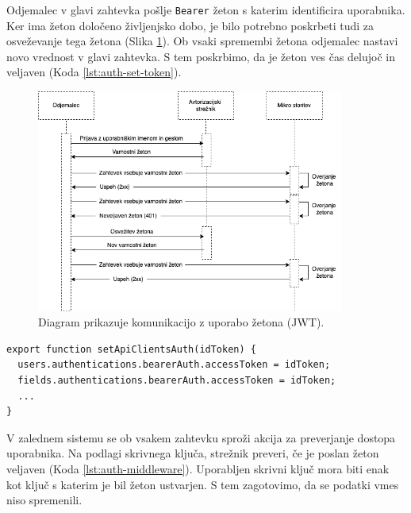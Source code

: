 Odjemalec v glavi zahtevka pošlje \verb=Bearer= žeton s katerim identificira uporabnika. Ker ima žeton določeno življenjsko dobo, je bilo potrebno poskrbeti tudi za osveževanje tega žetona (Slika \ref{token-flow}). Ob vsaki spremembi žetona odjemalec nastavi novo vrednost v glavi zahtevka. S tem poskrbimo, da je žeton ves čas delujoč in veljaven (Koda \ref{lst:auth-set-token}).

\begin{figure}[h]
\begin{center}
\includegraphics[width=0.9\textwidth]{slike/token-flow.png}
\end{center}
\caption{ Diagram prikazuje komunikacijo z uporabo žetona (JWT). }
\label{token-flow}
\end{figure}

\begin{lstlisting}[style=mystyle,caption={Izsek kode za nastavljanje žetona posameznemu odjemalcu.},label=lst:auth-set-token]
export function setApiClientsAuth(idToken) {
  users.authentications.bearerAuth.accessToken = idToken;
  fields.authentications.bearerAuth.accessToken = idToken;
  ...
}
\end{lstlisting}

V zalednem sistemu se ob vsakem zahtevku sproži akcija za preverjanje dostopa uporabnika. Na podlagi skrivnega ključa, strežnik preveri, če je poslan žeton veljaven (Koda \ref{lst:auth-middleware}). Uporabljen skrivni ključ mora biti enak kot ključ s katerim je bil žeton ustvarjen. S tem zagotovimo, da se podatki vmes niso spremenili. 

